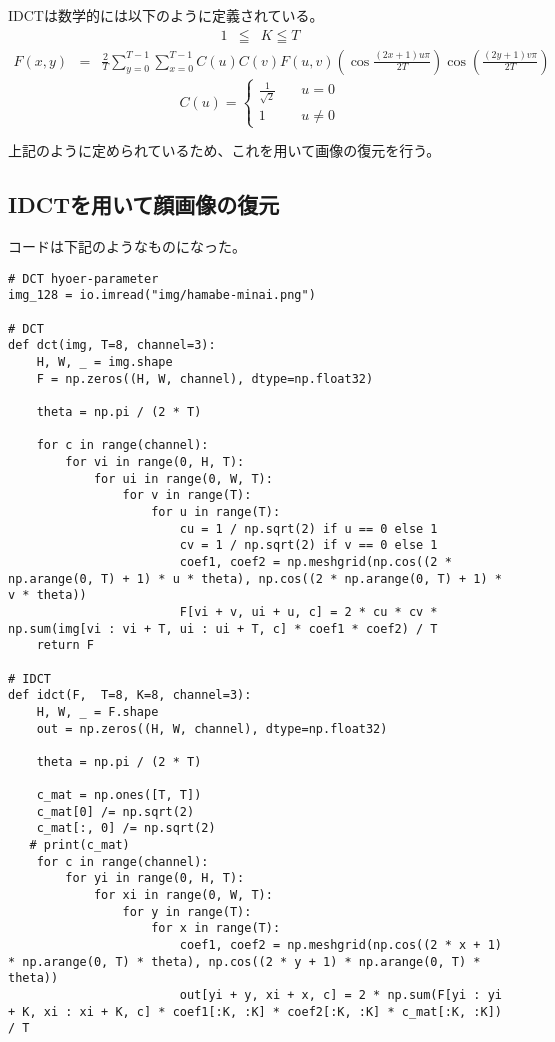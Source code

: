 \documentclass[dvipdfmx,uplatex]{jsarticle}
\begin{document}
\begin{spacing}{1.4}
IDCTは数学的には以下のように定義されている。
\begin{eqnarray*}
1 &\leqq& K \leqq T
\end{eqnarray*}
\begin{eqnarray}
F(x, y) &=& \frac{2}{T}\sum_{y=0}^{T-1}\sum_{x=0}^{T-1}C(u)C(v)F(u, v)(\cos\frac{(2x + 1)u\pi}{2T})\cos(\frac{(2y + 1)v\pi}{2T})
\end{eqnarray}
\[\displaystyle
C(u) =
\begin{cases}
\frac{1}{\sqrt{2}} & \quad u = 0 \\
1 & \quad u \neq 0
\end{cases}
\]

上記のように定められているため、これを用いて画像の復元を行う。

\subsection{IDCTを用いて顔画像の復元}
コードは下記のようなものになった。
\begin{lstlisting}[caption=DCT係数を元に画像を復元するソースコード]
# DCT hyoer-parameter
img_128 = io.imread("img/hamabe-minai.png")

# DCT
def dct(img, T=8, channel=3):
    H, W, _ = img.shape
    F = np.zeros((H, W, channel), dtype=np.float32)

    theta = np.pi / (2 * T)

    for c in range(channel):
        for vi in range(0, H, T):
            for ui in range(0, W, T):
                for v in range(T):
                    for u in range(T):
                        cu = 1 / np.sqrt(2) if u == 0 else 1
                        cv = 1 / np.sqrt(2) if v == 0 else 1
                        coef1, coef2 = np.meshgrid(np.cos((2 * np.arange(0, T) + 1) * u * theta), np.cos((2 * np.arange(0, T) + 1) * v * theta))
                        F[vi + v, ui + u, c] = 2 * cu * cv * np.sum(img[vi : vi + T, ui : ui + T, c] * coef1 * coef2) / T
    return F

# IDCT
def idct(F,  T=8, K=8, channel=3):
    H, W, _ = F.shape
    out = np.zeros((H, W, channel), dtype=np.float32)

    theta = np.pi / (2 * T)

    c_mat = np.ones([T, T])
    c_mat[0] /= np.sqrt(2)
    c_mat[:, 0] /= np.sqrt(2)
   # print(c_mat)
    for c in range(channel):
        for yi in range(0, H, T):
            for xi in range(0, W, T):
                for y in range(T):
                    for x in range(T):
                        coef1, coef2 = np.meshgrid(np.cos((2 * x + 1) * np.arange(0, T) * theta), np.cos((2 * y + 1) * np.arange(0, T) * theta))
                        out[yi + y, xi + x, c] = 2 * np.sum(F[yi : yi + K, xi : xi + K, c] * coef1[:K, :K] * coef2[:K, :K] * c_mat[:K, :K]) / T


\end{lstlisting}
\end{spacing}
\end{document}
